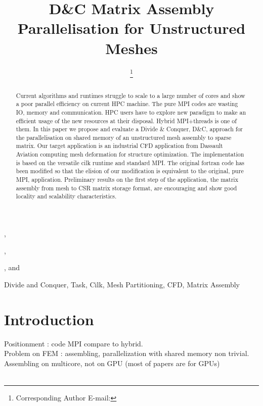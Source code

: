 \documentclass{IOS-Book-Article}
\begin{document}
\begin{frontmatter}              %

\title{D\&C Matrix Assembly Parallelisation for Unstructured Meshes}

\author[A]{ %
\thanks{Corresponding Author E-mail: }},
\author[A]{ },
\author[B]{ },
and
\author[C]{ }

\address[A]{PRISM - University of Versailles, France}
\address[B]{Somwhere}
\address[C]{Dassault Aviation, Saint-Cloud, France}

\begin{abstract}
Current algorithms and runtimes struggle to scale to a large number of cores and show a poor parallel efficiency on current HPC machine.
The pure MPI codes are wasting IO, memory and communication. HPC users have to explore new paradigm to make an efficient usage of the new resources at their disposal.
Hybrid MPI+threads is one of them. In this paper we propose and evaluate a Divide \& Conquer, D\&C, approach for the parallelisation on shared memory of an unstructured mesh assembly to sparse matrix.
Our target application is an industrial CFD application from Dassault Aviation computing mesh deformation for structure optimization.
The implementation is based on the versatile cilk runtime and standard MPI. The original fortran code has been modified so that the elision of our modification is equivalent to the original, pure MPI, application.
Preliminary results on the first step of the application, the matrix assembly from mesh to CSR matrix storage format, are encouraging and show good locality and scalability characteristics.
\end{abstract}

\begin{keyword}
Divide and Conquer, Task, Cilk, Mesh Partitioning, CFD, Matrix Assembly 
\end{keyword}
\end{frontmatter}

\thispagestyle{empty}
\pagestyle{empty}

\section*{Introduction}

Positionment : code MPI compare to hybrid.\\
Problem on FEM : assembling, parallelization with shared memory non trivial.\\
Assembling on multicore, not on GPU (most of papers are for GPUs)\\\\
\end{document}
